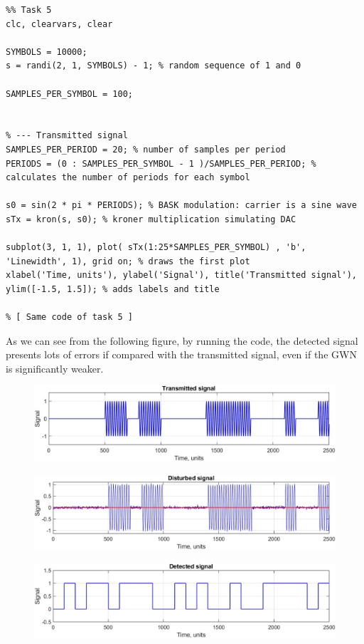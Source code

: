 \begin{lstlisting}
%% Task 5
clc, clearvars, clear

SYMBOLS = 10000;
s = randi(2, 1, SYMBOLS) - 1; % random sequence of 1 and 0

SAMPLES_PER_SYMBOL = 100;


% --- Transmitted signal
SAMPLES_PER_PERIOD = 20; % number of samples per period
PERIODS = (0 : SAMPLES_PER_SYMBOL - 1 )/SAMPLES_PER_PERIOD; % calculates the number of periods for each symbol

s0 = sin(2 * pi * PERIODS); % BASK modulation: carrier is a sine wave
sTx = kron(s, s0); % kroner multiplication simulating DAC

subplot(3, 1, 1), plot( sTx(1:25*SAMPLES_PER_SYMBOL) , 'b', 'Linewidth', 1), grid on; % draws the first plot
xlabel('Time, units'), ylabel('Signal'), title('Transmitted signal'), ylim([-1.5, 1.5]); % adds labels and title

% [ Same code of task 5 ]
\end{lstlisting}

\noindent As we can see from the following figure, by running the code, the detected signal presents lots of errors if compared with the transmitted signal, even if the GWN is significantly weaker. 

\begin{figure}[h!]
    \centering
    \includegraphics[width = \textwidth]{lab-2/imgs/task6_Transmitted.jpg}
\end{figure}
\vspace{-15px}
\begin{figure}[h!]
    \centering
    \includegraphics[width = \textwidth]{lab-2/imgs/task6_Noise.jpg}
\end{figure}
\vspace{-15px}
\begin{figure}[h!]
    \centering
    \includegraphics[width = \textwidth]{lab-2/imgs/task6_Detected.jpg}
\end{figure}

